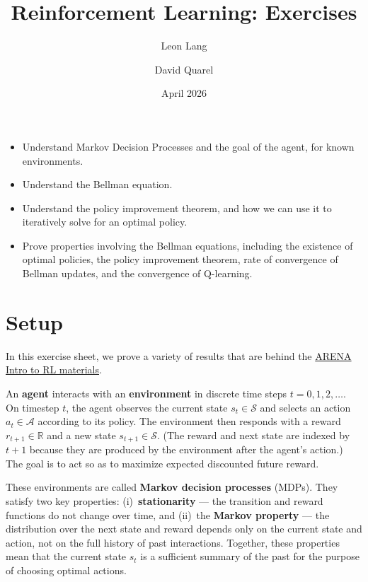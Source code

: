 \documentclass[11pt]{article}
\title{Reinforcement Learning: Exercises}
\author{Leon Lang \and David Quarel}
\date{April 2026}
\newcommand{\cS}{\mathcal{S}}
\newcommand{\cA}{\mathcal{A}}
\begin{document}
\maketitle

\begin{learningoutcomes}
  \begin{itemize}
    \item Understand Markov Decision Processes and the goal of the agent, for
      known environments.
    \item Understand the Bellman equation.
    \item Understand the policy improvement theorem, and how we can use it to
      iteratively solve for an optimal policy.
    \item Prove properties involving the Bellman equations, including the
      existence of optimal policies, the policy improvement theorem, rate of
      convergence of Bellman updates, and the convergence of Q-learning.
  \end{itemize}
\end{learningoutcomes}


\section*{Setup}
In this exercise sheet, we prove a variety of results that are behind the \href{https://learn.arena.education/chapter2_rl/01_intro_rl/}{ARENA Intro to RL materials}. 

An \textbf{agent} interacts with an \textbf{environment} in discrete time steps $t = 0, 1, 2, \ldots$. On timestep $t$, the agent observes the current state $s_t \in \cS$ and selects an action $a_t \in \cA$ according to its policy. The environment then responds with a reward $r_{t+1} \in \mathbb{R}$ and a new state $s_{t+1} \in \cS$. (The reward and next state are indexed by $t+1$ because they are produced by the environment after the agent's action.) The goal is to act so as to maximize expected discounted future reward.

These environments are called \textbf{Markov decision processes} (MDPs). They satisfy two key properties: (i)~\textbf{stationarity} --- the transition and reward functions do not change over time, and (ii)~the \textbf{Markov property} --- the distribution over the next state and reward depends only on the current state and action, not on the full history of past interactions. Together, these properties mean that the current state $s_t$ is a sufficient summary of the past for the purpose of choosing optimal actions.
\end{document}
